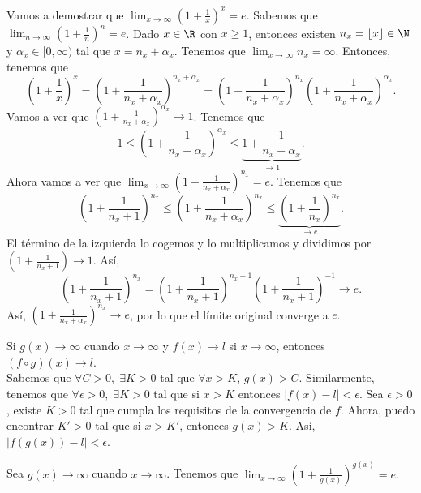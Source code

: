 \begin{eg}
\normalfont Vamos a demostrar que $\displaystyle \lim_{x \to \infty}\left(1 + \frac{1}{x}\right)^{x}=e $. Sabemos que $\displaystyle \lim_{n \to \infty}\left(1 + \frac{1}{n}\right)^{n} =e $. Dado $\displaystyle x \in \R $ con $\displaystyle x \geq 1 $, entonces existen $\displaystyle n_{x} = \left\lfloor x \right\rfloor \in \N $ y $\displaystyle \alpha_{x}\in[0,\infty) $ tal que $\displaystyle x = n_{x} +\alpha_{x} $. Tenemos que $\displaystyle \lim_{x \to \infty}n_{x} = \infty $. Entonces, tenemos que
\[\left(1 + \frac{1}{x}\right)^{x} = \left(1 + \frac{1}{n_{x}+\alpha_{x}}\right)^{n_{x}+\alpha_{x}}= \left(1 + \frac{1}{n_{x}+\alpha_{x}}\right)^{n_{x}} \left(1 + \frac{1}{n_{x}+\alpha_{x}}\right)^{\alpha_{x}}.\]
Vamos a ver que $\displaystyle \left(1 + \frac{1}{n_{x}+\alpha_{x}}\right)^{\alpha_{x}} \to 1 $. Tenemos que
\[1 \leq \left(1 + \frac{1}{n_{x}+\alpha_{x}}\right)^{\alpha_{x}}\leq \underbrace{ 1 + \frac{1}{n_{x}+\alpha_{x}}}_{\to1} .\]
Ahora vamos a ver que $\displaystyle \lim_{x \to \infty}\left(1+\frac{1}{n_{x}+\alpha_{x}}\right)^{n_{x}}=e $. Tenemos que 
\[\left(1+\frac{1}{n_{x}+1}\right)^{n_{x}}\leq\left(1 + \frac{1}{n_{x}+\alpha_{x}}\right)^{n_{x}} \leq \underbrace{\left(1 + \frac{1}{n_{x}}\right)^{n_{x}}}_{\to e} .\]
El término de la izquierda lo cogemos y lo multiplicamos y dividimos por $\displaystyle \left(1+\frac{1}{n_{x}+1}\right) \to 1 $. Así,
\[\left(1+\frac{1}{n_{x}+1}\right)^{n_{x}} = \left(1 + \frac{1}{n_{x}+1}\right)^{n_{x}+1}\left(1+\frac{1}{n_{x}+1}\right)^{-1} \to e .\]
Así, $\displaystyle \left(1+\frac{1}{n_{x}+\alpha_{x}}\right)^{n_{x}} \to e $, por lo que el límite original converge a $\displaystyle e $.
\end{eg}

\begin{eg}
\normalfont Si $\displaystyle g\left(x\right) \to \infty $ cuando $\displaystyle x \to \infty $ y $\displaystyle f\left(x\right) \to l $ si $\displaystyle x \to \infty $, entonces $\displaystyle \left(f \circ g\right)\left(x\right) \to l $. \\
Sabemos que $\displaystyle \forall C > 0, \; \exists K > 0 $ tal que $\displaystyle \forall x > K $, $\displaystyle g\left(x\right) > C $. Similarmente, tenemos que $\displaystyle \forall \epsilon > 0, \; \exists K > 0 $ tal que si $\displaystyle x > K $ entonces $\displaystyle \left|f\left(x\right)-l\right|<\epsilon  $. Sea $\displaystyle \epsilon > 0 $, existe $\displaystyle K > 0 $ tal que cumpla los requisitos de la convergencia de $\displaystyle f $. Ahora, puedo encontrar $\displaystyle K' > 0 $ tal que si $\displaystyle x > K' $, entonces $\displaystyle g\left(x\right) > K $. Así, $\displaystyle \left|f\left(g\left(x\right)\right)-l\right|<\epsilon  $.
\end{eg}
\begin{fcolorary}[]
\normalfont Sea $\displaystyle g\left(x\right) \to \infty $ cuando $\displaystyle x \to \infty $. Tenemos que $\displaystyle \lim_{x \to \infty}\left(1+\frac{1}{g\left(x\right)}\right)^{g\left(x\right)}=e. $ 
\end{fcolorary}

